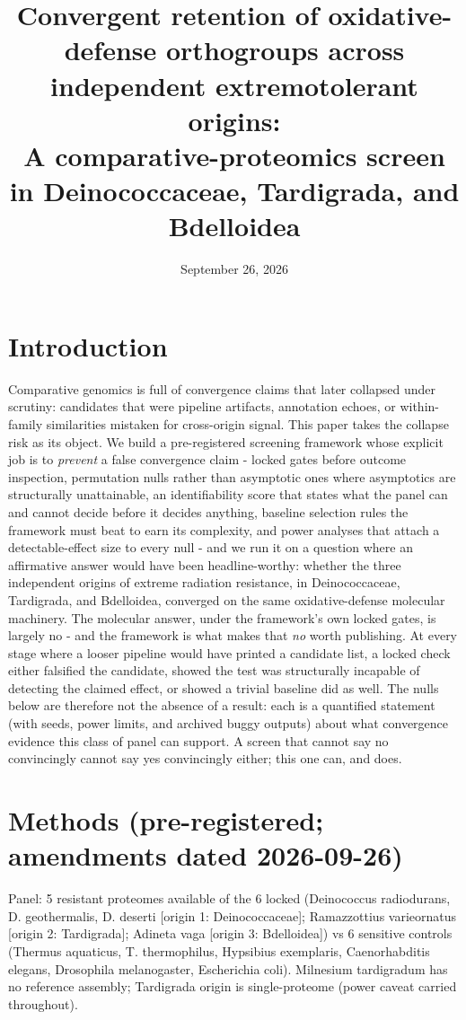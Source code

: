 \documentclass[12pt,a4paper]{article}
\title{Convergent retention of oxidative-defense orthogroups across independent extremotolerant origins:\\A comparative-proteomics screen in Deinococcaceae, Tardigrada, and Bdelloidea}
\author{}
\date{September 26, 2026}
\begin{document}
\maketitle

\section{Introduction}
Comparative genomics is full of convergence claims that later collapsed under scrutiny: candidates that were pipeline artifacts, annotation echoes, or within-family similarities mistaken for cross-origin signal. This paper takes the collapse risk as its object. We build a pre-registered screening framework whose explicit job is to \emph{prevent} a false convergence claim - locked gates before outcome inspection, permutation nulls rather than asymptotic ones where asymptotics are structurally unattainable, an identifiability score that states what the panel can and cannot decide before it decides anything, baseline selection rules the framework must beat to earn its complexity, and power analyses that attach a detectable-effect size to every null - and we run it on a question where an affirmative answer would have been headline-worthy: whether the three independent origins of extreme radiation resistance, in Deinococcaceae, Tardigrada, and Bdelloidea, converged on the same oxidative-defense molecular machinery.
The molecular answer, under the framework's own locked gates, is largely no - and the framework is what makes that \emph{no} worth publishing. At every stage where a looser pipeline would have printed a candidate list, a locked check either falsified the candidate, showed the test was structurally incapable of detecting the claimed effect, or showed a trivial baseline did as well. The nulls below are therefore not the absence of a result: each is a quantified statement (with seeds, power limits, and archived buggy outputs) about what convergence evidence this class of panel can support. A screen that cannot say no convincingly cannot say yes convincingly either; this one can, and does.



\section{Methods (pre-registered; amendments dated 2026-09-26)}
Panel: 5 resistant proteomes available of the 6 locked (Deinococcus radiodurans, D. geothermalis, D. deserti [origin 1: Deinococcaceae]; Ramazzottius varieornatus [origin 2: Tardigrada]; Adineta vaga [origin 3: Bdelloidea]) vs 6 sensitive controls (Thermus aquaticus, T. thermophilus, Hypsibius exemplaris, Caenorhabditis elegans, Drosophila melanogaster, Escherichia coli). Milnesium tardigradum has no reference assembly; Tardigrada origin is single-proteome (power caveat carried throughout).
\end{document}
